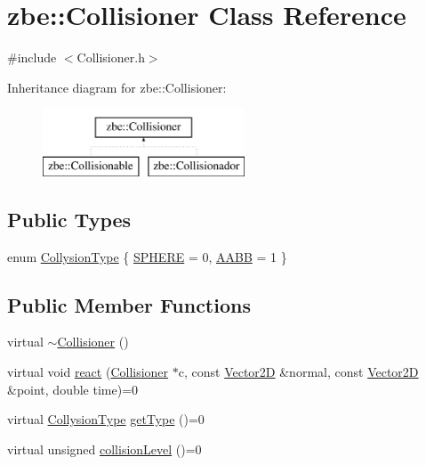 \hypertarget{classzbe_1_1_collisioner}{}\section{zbe\+:\+:Collisioner Class Reference}
\label{classzbe_1_1_collisioner}


{\ttfamily \#include $<$Collisioner.\+h$>$}

Inheritance diagram for zbe\+:\+:Collisioner\+:\begin{figure}[H]
\begin{center}
\leavevmode
\includegraphics[height=2.000000cm]{classzbe_1_1_collisioner}
\end{center}
\end{figure}
\subsection*{Public Types}
\begin{DoxyCompactItemize}
\item 
enum \hyperlink{classzbe_1_1_collisioner_af210f5ae0183381df428b4b4f72946eb}{Collysion\+Type} \{ \hyperlink{classzbe_1_1_collisioner_af210f5ae0183381df428b4b4f72946eba65bc42fd5c16096214440f43460a4b7d}{S\+P\+H\+E\+R\+E} = 0, 
\hyperlink{classzbe_1_1_collisioner_af210f5ae0183381df428b4b4f72946ebad842cd828b17a573ed9d7d9c4f810816}{A\+A\+B\+B} = 1
 \}
\end{DoxyCompactItemize}
\subsection*{Public Member Functions}
\begin{DoxyCompactItemize}
\item 
virtual \hyperlink{classzbe_1_1_collisioner_a925d62e829a8c7d8a3589a8de01453d5}{$\sim$\+Collisioner} ()
\item 
virtual void \hyperlink{classzbe_1_1_collisioner_aee4f5ba729979c5811ab1f64689041b6}{react} (\hyperlink{classzbe_1_1_collisioner}{Collisioner} $\ast$c, const \hyperlink{classzbe_1_1_vector2_d}{Vector2\+D} \&normal, const \hyperlink{classzbe_1_1_vector2_d}{Vector2\+D} \&point, double time)=0
\item 
virtual \hyperlink{classzbe_1_1_collisioner_af210f5ae0183381df428b4b4f72946eb}{Collysion\+Type} \hyperlink{classzbe_1_1_collisioner_aa97f90d8e249f8729b283e4bcbbd8ee8}{get\+Type} ()=0
\item 
virtual unsigned \hyperlink{classzbe_1_1_collisioner_abf434f16ac9a1eceb9509c10b2ca4ec7}{collision\+Level} ()=0
\end{DoxyCompactItemize}


